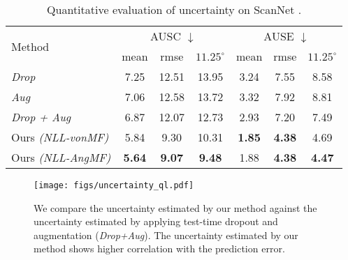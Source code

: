 \documentclass[10pt,twocolumn,letterpaper]{article}
\begin{document}
\begin{table}[t]
\setlength\tabcolsep{1.5pt}
\begin{center}
\begin{tabular}{l|ccc|ccc}
\toprule
\multirow{2}{4em}{Method} & \multicolumn{3}{c|}{\small AUSC $\downarrow$} &
\multicolumn{3}{c}{\small AUSE $\downarrow$}\\
\cline{2-7}
& {\small mean} & {\small rmse} & {\footnotesize $11.25^{\circ}$}
& {\small mean} & {\small rmse} & {\footnotesize $11.25^{\circ}$}\\
\midrule
\textit{Drop} 
& 7.25 & 12.51 & 13.95 & 3.24 & 7.55 & 8.58\\
\textit{Aug} 
& 7.06 & 12.58 & 13.72 & 3.32 & 7.92 & 8.81\\
\textit{Drop + Aug} 
& 6.87 & 12.07 & 12.73 & 2.93 & 7.20 & 7.49\\
\hline
Ours \textit{(NLL-vonMF)} 
& 5.84 & 9.30 & 10.31 & \textbf{1.85} & \textbf{4.38} & 4.69\\
Ours \textit{(NLL-AngMF)} 
& \textbf{5.64} & \textbf{9.07} & \textbf{9.48} & 1.88 & \textbf{4.38} & \textbf{4.47}\\
\bottomrule
\end{tabular}
\end{center}
\caption{Quantitative evaluation of uncertainty on ScanNet \cite{ScanNet}.}
\label{table:uncertainty-scannet}
\end{table}

\begin{figure}[t]
\begin{center}
\texttt{[image: figs/uncertainty\_ql.pdf]}
\end{center}
\caption{We compare the uncertainty estimated by our method against the uncertainty estimated by applying test-time dropout and augmentation (\textit{Drop+Aug}). The uncertainty estimated by our method shows higher correlation with the prediction error.}
\label{fig:uncertainty_comparison}
\end{figure}
\end{document}
